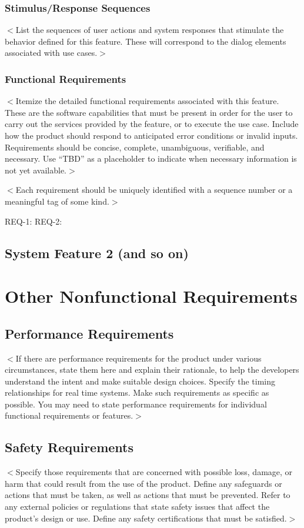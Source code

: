 \documentclass{scrreprt}
\begin{document}
\subsection{Stimulus/Response Sequences}
$<$List the sequences of user actions and system responses that stimulate the 
behavior defined for this feature. These will correspond to the dialog elements 
associated with use cases.$>$

\subsection{Functional Requirements}
$<$Itemize the detailed functional requirements associated with this feature.  
These are the software capabilities that must be present in order for the user 
to carry out the services provided by the feature, or to execute the use case.  
Include how the product should respond to anticipated error conditions or 
invalid inputs. Requirements should be concise, complete, unambiguous, 
verifiable, and necessary. Use “TBD” as a placeholder to indicate when necessary 
information is not yet available.$>$

$<$Each requirement should be uniquely identified with a sequence number or a 
meaningful tag of some kind.$>$

REQ-1:	REQ-2:

\section{System Feature 2 (and so on)}


\chapter{Other Nonfunctional Requirements}

\section{Performance Requirements}
$<$If there are performance requirements for the product under various 
circumstances, state them here and explain their rationale, to help the 
developers understand the intent and make suitable design choices. Specify the 
timing relationships for real time systems. Make such requirements as specific 
as possible. You may need to state performance requirements for individual 
functional requirements or features.$>$

\section{Safety Requirements}
$<$Specify those requirements that are concerned with possible loss, damage, or 
harm that could result from the use of the product. Define any safeguards or 
actions that must be taken, as well as actions that must be prevented. Refer to 
any external policies or regulations that state safety issues that affect the 
product’s design or use. Define any safety certifications that must be 
satisfied.$>$
\end{document}
